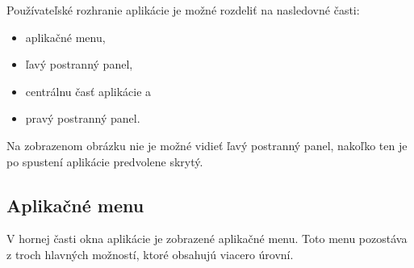 {Používateľské rozhranie aplikácie je možné rozdeliť na nasledovné časti:
\begin {itemize}
\item {aplikačné menu,}
\item {ľavý postranný panel,}
\item {centrálnu časť aplikácie a}
\item {pravý postranný panel.}
\end {itemize}

Na zobrazenom obrázku nie je možné vidieť ľavý postranný panel, nakoľko ten je po spustení aplikácie predvolene skrytý.\clearpage

\subsection {Aplikačné menu}
V hornej časti okna aplikácie je zobrazené aplikačné menu. Toto menu pozostáva z troch hlavných možností, ktoré obsahujú viacero úrovní.

}
